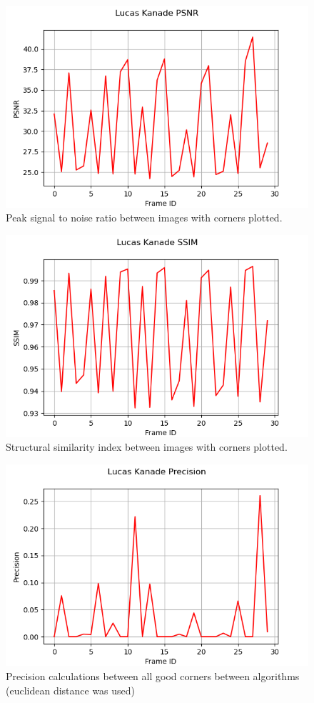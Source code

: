 \documentclass[11pt, conference, letterpaper]{IEEEtran}
\begin{document}
\begin{figure}[t]
    \centering
    \includegraphics[width=0.9\linewidth]{images/lk_psnr.png}
    \caption{Peak signal to noise ratio between images with corners plotted.}
    \label{fig:lk-psnr}
\end{figure}

\begin{figure}[t]
    \centering
    \includegraphics[width=0.9\linewidth]{images/lk_ssim.png}
    \caption{Structural similarity index between images with corners plotted.}
    \label{fig:lk-ssim}
\end{figure}

\onecolumn

\begin{figure}[t]
    \centering
    \includegraphics[width=0.45\linewidth]{images/lk_precision.png}
    \caption{Precision calculations between all good corners between algorithms (euclidean distance was used)}
    \label{fig:lk-prec}
\end{figure}
\end{document}
